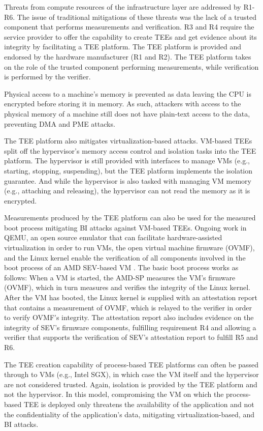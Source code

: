 Threats from compute resources of the infrastructure layer are addressed by
R1-R6. The issue of traditional mitigations of these threats was the lack of a
trusted component that performs measurements and verification. R3 and R4 require
the service provider to offer the capability to create TEEs and get evidence
about its integrity by facilitating a TEE platform. The TEE platform is provided
and endorsed by the hardware manufacturer (R1 and R2). The TEE platform takes on
the role of the trusted component performing measurements, while verification is
performed by the verifier.

Physical access to a machine's memory is prevented as data leaving the CPU is
encrypted before storing it in memory. As such, attackers with access to the
physical memory of a machine still does not have plain-text access to the data,
preventing DMA and PME attacks.

The TEE platform also mitigates virtualization-based attacks. VM-based TEEs
split off the hypervisor's memory access control and isolation tasks into the
TEE platform. The hypervisor is still provided with interfaces to manage VMs
(e.g., starting, stopping, suspending), but the TEE platform implements the
isolation guarantee. And while the hypervisor is also tasked with managing VM
memory (e.g., attaching and releasing), the hypervisor can not read the memory
as it is encrypted.

Measurements produced by the TEE platform can also be used for the measured boot
process mitigating BI attacks against VM-based TEEs. Ongoing work in QEMU, an
open source emulator that can facilitate hardware-assisted virtualization in
order to run VMs, the open virtual machine firmware (OVMF), and the Linux kernel
enable the verification of all components involved in the boot process of an AMD
SEV-based VM \cite{decentriq2022amdsevboot}. The basic boot process works as
follows: When a VM is started, the AMD-SP measures the VM's firmware (OVMF),
which in turn measures and verifies the integrity of the Linux kernel. After the
VM has booted, the Linux kernel is supplied with an attestation report that
contains a measurement of OVMF, which is relayed to the verifier in order to
verify OVMF's integrity. The attestation report also includes evidence on the
integrity of SEV's firmware components, fulfilling requirement R4 and allowing a
verifier that supports the verification of SEV's attestation report to fulfill
R5 and R6.

The TEE creation capability of process-based TEE platforms can often be passed
through to VMs (e.g., Intel SGX), in which case the VM itself and the hypervisor
are not considered trusted. Again, isolation is provided by the TEE platform and
not the hypervisor. In this model, compromising the VM on which the
process-based TEE is deployed only threatens the availability of the application
and not the confidentiality of the application's data, mitigating
virtualization-based, and BI attacks.

